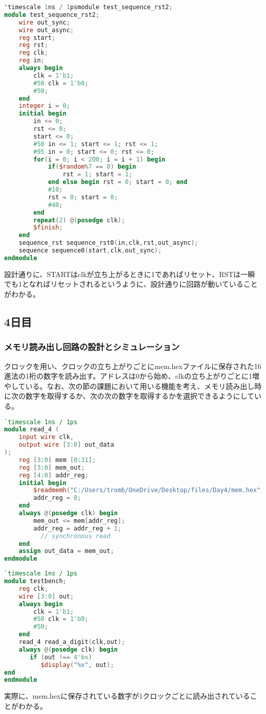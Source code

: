 \documentclass{ltjsarticle}
\begin{document}
\begin{lstlisting}[caption=リセット付き順序回路テストベンチ,language=verilog]
'timescale 1ns / 1psmodule test_sequence_rst2;
module test_sequence_rst2;
    wire out_sync;
    wire out_async;
    reg start;
    reg rst;
    reg clk;
    reg in;
    always begin
        clk = 1'b1;
        #50 clk = 1'b0;
        #50;
    end
    integer i = 0;
    initial begin
        in <= 0;
        rst <= 0;
        start <= 0;
        #50 in <= 1; start <= 1; rst <= 1;
        #95 in = 0; start <= 0; rst <= 0;
        for(i = 0; i < 200; i = i + 1) begin
            if($random%7 == 0) begin
                rst = 1; start = 1;
            end else begin rst = 0; start = 0; end
            #10;
            rst = 0; start = 0;
            #40;
        end
        repeat(2) @(posedge clk);
        $finish;
    end
    sequence_rst sequence_rst0(in,clk,rst,out_async);
    sequence sequence0(start,clk,out_sync);
endmodule
\end{lstlisting}
設計通りに、STARTはclkが立ち上がるときに1であればリセット、RSTは一瞬でも1となればリセットされるというように、設計通りに回路が動いていることがわかる。
\subsection{4日目}
\subsubsection{メモリ読み出し回路の設計とシミュレーション}
クロックを用い、クロックの立ち上がりごとにmem.hexファイルに保存された16進法の1桁の数字を読み出す。アドレスは0から始め、clkの立ち上がりごとに1増やしている。なお、次の節の課題において用いる機能を考え、メモリ読み出し時に次の数字を取得するか、次の次の数字を取得するかを選択できるようにしている。
\begin{lstlisting}[caption=メモリ読み出し回路デザイン,language=verilog]
`timescale 1ns / 1ps
module read_4 ( 
    input wire clk,
    output wire [3:0] out_data
);
    reg [3:0] mem [0:31];
    reg [3:0] mem_out;
    reg [4:0] addr_reg;
    initial begin
        $readmemh("C:/Users/tromb/OneDrive/Desktop/files/Day4/mem.hex", mem);
        addr_reg = 0;
    end
    always @(posedge clk) begin
        mem_out <= mem[addr_reg];
        addr_reg = addr_reg + 1;
          // synchronous read
    end
    assign out_data = mem_out;  
endmodule
\end{lstlisting}
\begin{lstlisting}[caption=メモリ読み出し回路テストベンチ,language=verilog]
`timescale 1ns / 1ps
module testbench;
	reg clk;
	wire [3:0] out;
	always begin
		clk = 1'b1;
		#50 clk = 1'b0;
		#50;
	end
	read_4 read_a_digit(clk,out);
	always @(posedge clk) begin
	   if (out !== 4'bx)
	      $display("%x", out);
end
endmodule
\end{lstlisting}
実際に、mem.hexに保存されている数字が1クロックごとに読み出されていることがわかる。
\end{document}
